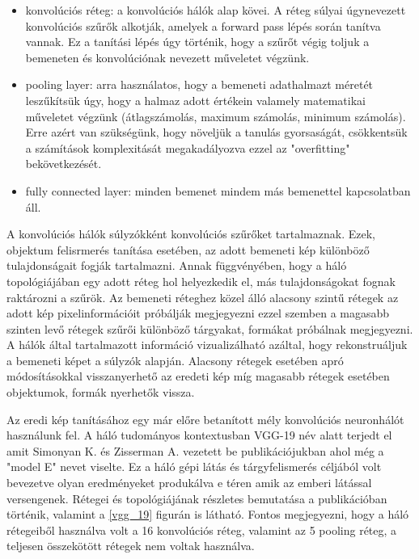 \documentclass[12pt, a4paper, oneside]{book}
\theoremstyle{tetel}
\begin{document}
\begin{itemize}
	\item konvolúciós réteg: a konvolúciós hálók alap kövei. A réteg súlyai úgynevezett konvolúciós szűrők alkotják, amelyek a forward pass lépés során tanítva vannak. Ez a tanítási lépés úgy történik, hogy a szűrőt végig toljuk a bemeneten és konvolúciónak nevezett műveletet végzünk. 
	\item pooling layer: arra használatos, hogy a bemeneti adathalmazt méretét leszűkítsük úgy, hogy a halmaz adott értékein valamely matematikai műveletet végzünk (átlagszámolás, maximum számolás, minimum számolás). Erre azért van szükségünk, hogy növeljük a tanulás gyorsaságát, csökkentsük a számítások komplexitását megakadályozva ezzel az "overfitting" bekövetkezését.
	\item fully connected layer: minden bemenet mindem más bemenettel kapcsolatban áll.
\end{itemize}

A konvolúciós hálók súlyzókként konvolúciós szűrőket tartalmaznak. Ezek, objektum felisrmerés tanítása esetében, az adott bemeneti kép különböző tulajdonságait fogják tartalmazni. Annak függvényében, hogy a háló topológiájában egy adott réteg hol helyezkedik el, más tulajdonságokat fognak raktározni a szűrök. Az bemeneti réteghez közel álló alacsony szintű rétegek az adott kép pixelinformációit próbálják megjegyezni ezzel szemben a magasabb szinten levő rétegek szűrői különböző tárgyakat, formákat próbálnak megjegyezni\cite{27}\cite{28}. A hálók által tartalmazott információ vizualizálható azáltal, hogy rekonstruáljuk a bemeneti képet a súlyzók alapján. Alacsony rétegek esetében apró módosításokkal visszanyerhető az eredeti kép míg magasabb rétegek esetében objektumok, formák nyerhetők vissza.

Az eredi kép tanításához egy már előre betanított mély konvolúciós neuronhálót használunk fel. A háló tudományos kontextusban VGG-19 név alatt terjedt el amit Simonyan K. és  Zisserman A. vezetett be publikációjukban\cite{29} ahol még a "model E" nevet viselte. Ez a háló gépi látás és tárgyfelismerés céljából volt bevezetve olyan eredményeket produkálva e téren amik az emberi látással versengenek. Rétegei és topológiájának részletes bemutatása a \cite{29} publikációban történik, valamint a \ref{vgg_19} figurán is látható. Fontos megjegyezni, hogy a háló rétegeiből használva volt a 16 konvolúciós réteg, valamint az 5 pooling réteg, a teljesen összekötött rétegek nem voltak használva.
\end{document}
